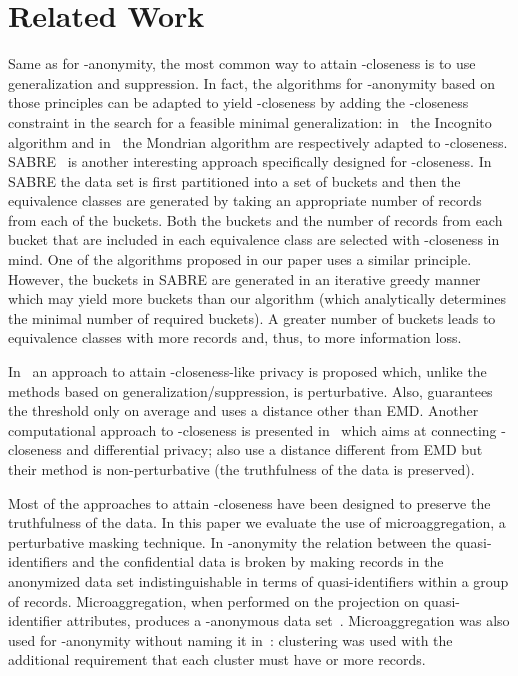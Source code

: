 \documentclass[10pt,journal,compsoc]{IEEEtran}
\theoremstyle{definition}
\theoremstyle{plain}
\begin{document}
\section{Related Work}
\label{sec:related_work}
Same as for -anonymity, the most common way to attain -closeness
is to use generalization and suppression. In fact, the algorithms
for -anonymity based on those principles 
can be adapted to yield -closeness by adding the
-closeness constraint in the search for a feasible
minimal generalization: in~\cite{Li2007t-Closeness} the Incognito
algorithm and in~\cite{Li2010Closeness} the Mondrian algorithm are
respectively adapted to -closeness. 
SABRE~\cite{Cao} is another interesting approach specifically designed 
for -closeness. In SABRE the data set is first partitioned into 
a set of buckets and 
then the equivalence classes are generated 
by taking an appropriate number of records 
from each of the buckets. Both the buckets and the number of records from
each bucket that are included in each equivalence class 
are selected with -closeness
in mind. One of the algorithms proposed in our paper uses a similar
principle. However,
the buckets in SABRE are generated in an iterative greedy manner
which may yield more buckets than our algorithm (which 
analytically determines
the minimal number of required buckets). 
A greater number of buckets
leads to equivalence classes with more records and, thus, to more information loss.

In~\cite{Rebollo} an approach to attain -closeness-like privacy is
 proposed
which, unlike the methods based on generalization/suppression, is perturbative. 
Also, \cite{Rebollo} guarantees the threshold  only on 
average and uses a distance 
other than EMD. Another computational approach to -closeness 
is presented 
in~\cite{DomingoSoria15,Soria2013differential} which aims at 
connecting -closeness and
differential privacy; \cite{DomingoSoria15,Soria2013differential} also
use a distance different from EMD but their method
is non-perturbative (the truthfulness of the data is preserved).

Most of the approaches to attain -closeness have been designed to
preserve the truthfulness of the data. In this paper we evaluate the use of
microaggregation, a perturbative masking technique. 
In -anonymity the relation between the quasi-identifiers and the
confidential data is broken by making records in the anonymized data
set indistinguishable in terms of quasi-identifiers within a group
of  records. Microaggregation, when performed on the 
projection on quasi-identifier
attributes, produces a -anonymous data set~\cite{Domingo2005Ordinal}.
Microaggregation was also used for -anonymity without naming it 
in~\cite{Li2008LocalRecoding}: clustering was used with the 
additional requirement that each cluster must have  or more 
records.
\end{document}
